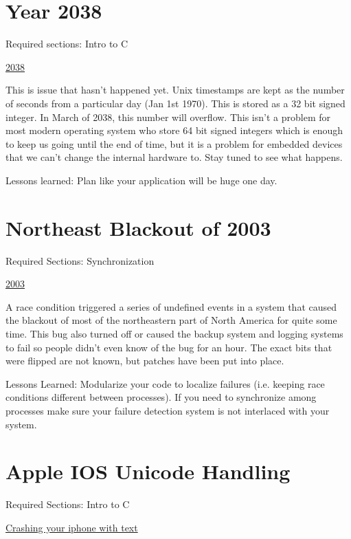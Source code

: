 \section{Year 2038}

Required sections: Intro to C

\href{https://en.wikipedia.org/wiki/Year_2038_problem}{2038}

This is issue that hasn't happened yet.
Unix timestamps are kept as the number of seconds from a particular day (Jan 1st 1970).
This is stored as a 32 bit signed integer.
In March of 2038, this number will overflow.
This isn't a problem for most modern operating system who store 64 bit signed integers which is enough to keep us going until the end of time, but it is a problem for embedded devices that we can't change the internal hardware to.
Stay tuned to see what happens.

Lessons learned: Plan like your application will be huge one day.

\section{Northeast Blackout of 2003}

Required Sections: Synchronization

\href{https://en.wikipedia.org/wiki/Northeast_blackout_of_2003}{2003}

A race condition triggered a series of undefined events in a system that caused the blackout of most of the northeastern part of North America for quite some time.
This bug also turned off or caused the backup system and logging systems to fail so people didn't even know of the bug for an hour. The exact bits that were flipped are not known, but patches have been put into place.

Lessons Learned: Modularize your code to localize failures (i.e. keeping race conditions different between processes). If you need to synchronize among processes make sure your failure detection system is not interlaced with your system.


\section{Apple IOS Unicode Handling}

Required Sections: Intro to C

\href{http://appleinsider.com/articles/15/05/26/bug-in-ios-notifications-handling-crashes-iphones-with-a-simple-text}{Crashing your iphone with text}


